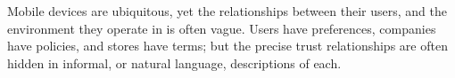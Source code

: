 \documentclass[thesis.tex]{subfiles}
\begin{document}

Mobile devices are ubiquitous, yet the relationships between their users, and
the environment they operate in is often vague. Users have preferences,
companies have policies, and stores have terms; but the precise trust
relationships are often hidden in informal, or natural language, descriptions of
each.
\end{document}
